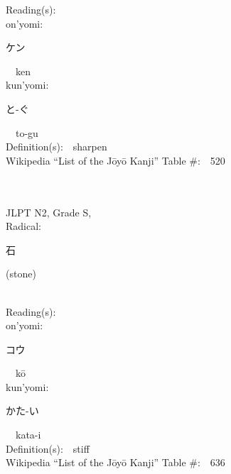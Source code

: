 \begin{multicols}{2}
Reading(s):\ \ \\
{\hspace*{1em}}on'yomi:\ \ \\
{\hspace*{2em}}{\begin{CJK}{UTF8}{min} ケン \end{CJK}}\ \ ken\ \ \\
{\hspace*{1em}}kun'yomi:\ \ \\
{\hspace*{2em}}{\begin{CJK}{UTF8}{min} と-ぐ \end{CJK}}\ \ to-gu\ \ \\
Definition(s):\ \ sharpen \\
Wikipedia ``List of the J\=oy\=o Kanji'' Table \#:\ \ 520 \\
\ \ \\
{\fontsize{34pt}{40pt}  }\ \ \\  %
{JLPT N2, Grade S, \\Radical:\ \ {\begin{CJK}{UTF8}{min} 石 \end{CJK}} (stone) } \\
Reading(s):\ \ \\
{\hspace*{1em}}on'yomi:\ \ \\
{\hspace*{2em}}{\begin{CJK}{UTF8}{min} コウ \end{CJK}}\ \ k\=o\ \ \\
{\hspace*{1em}}kun'yomi:\ \ \\
{\hspace*{2em}}{\begin{CJK}{UTF8}{min} かた-い \end{CJK}}\ \ kata-i\ \ \\
Definition(s):\ \ stiff \\
Wikipedia ``List of the J\=oy\=o Kanji'' Table \#:\ \ 636 \\
\ \ \\
{\fontsize{34pt}{40pt}  }\ \ \\  %

\end{multicols}

